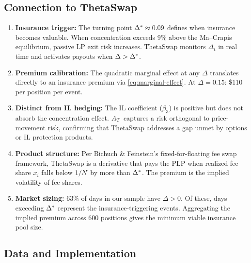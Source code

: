 
\subsection{Connection to ThetaSwap}\label{subsec:econ-thetaswap}

\begin{enumerate}
  \item \textbf{Insurance trigger:} The turning point $\Delta^{*} \approx 0.09$
    defines when insurance becomes valuable. When concentration exceeds 9\%
    above the Ma--Crapis equilibrium, passive LP exit risk increases.
    ThetaSwap monitors $\Delta_t$ in real time and activates payouts when
    $\Delta > \Delta^{*}$.

  \item \textbf{Premium calibration:} The quadratic marginal effect at any
    $\Delta$ translates directly to an insurance premium via
    \cref{eq:marginal-effect}. At $\Delta = 0.15$: \$110 per position per
    event.

  \item \textbf{Distinct from IL hedging:} The IL coefficient ($\beta_3$) is
    positive but does not absorb the concentration effect. $A_T$ captures a
    risk orthogonal to price-movement risk, confirming that ThetaSwap
    addresses a gap unmet by options or IL protection products.

  \item \textbf{Product structure:} Per Bichuch \& Feinstein's
    fixed-for-floating fee swap framework, ThetaSwap is a derivative that pays
    the PLP when realized fee share $x_i$ falls below $1/N$ by more
    than $\Delta^{*}$. The premium is the implied volatility of fee shares.

  \item \textbf{Market sizing:} 63\% of days in our sample have
    $\Delta > 0$. Of these, days exceeding $\Delta^{*}$ represent the
    insurance-triggering events. Aggregating the implied premium across 600
    positions gives the minimum viable insurance pool size.
\end{enumerate}


\subsection{Data and Implementation}\label{subsec:econ-data}

